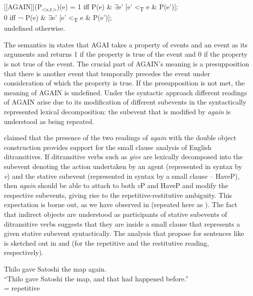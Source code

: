 \documentclass[output=paper,modfonts,nonflat,
 hidelinks
]{langsci/langscibook}
\begin{document}
 \ea\label{ex:bondarenko:}
{[[AGAIN]](P\textsubscript{<s,t>})(e) =   1 iff          P(e) \& ${\exists}$e’ [e’ <\textsubscript{T} e \& P(e’)];}\\

             0 iff ¬ P(e) \& ${\exists}$e’ [e’ <\textsubscript{T} e \& P(e’)];\\
\glt         undefined otherwise.
\z


The semantics in  states that AGAI takes a property of events and an event as its arguments and returns 1 if the property is true of the event and 0 if the property is not true of the event. The crucial part of AGAIN’s meaning is a presupposition that there is another event that temporally precedes the event under consideration of which the property is true. If the presupposition is not met, the meaning of AGAIN is undefined. Under the syntactic approach different readings of AGAIN arise due to its modification of different subevents in the syntactically represented lexical decomposition: the subevent that is modified by \textit{again} is understood as being repeated.



\citet{BeckJohnson2004} claimed that the presence of the two readings of \textit{again} with the double object construction provides support for the small clause analysis of English ditransitives. If ditransitive verbs such as \textit{give} are lexically decomposed into the subevent denoting the action undertaken by an agent (represented in syntax by \textit{v}) and the stative subevent (represented in syntax by a small clause – HaveP), then \textit{again} should be able to attach to both \textit{v}P and HaveP and modify the respective subevents, giving rise to the repetitive-restitutive ambiguity. This expectation is borne out, as we have observed in  (repeated here as ). The fact that indirect objects are understood as participants of stative subevents of ditransitive verbs suggests that they are inside a small clause that represents a given stative subevent syntactically. The analysis that \citet{BeckJohnson2004} propose for sentences like  is sketched out in  and  (for the repetitive and the restitutive reading, respectively).


 \ea\label{ex:bondarenko:}
{Thilo gave Satoshi the map again.}\\

\ea “Thilo gave Satoshi the map, and that had happened before.”\\
= {repetitive}
\end{document}
